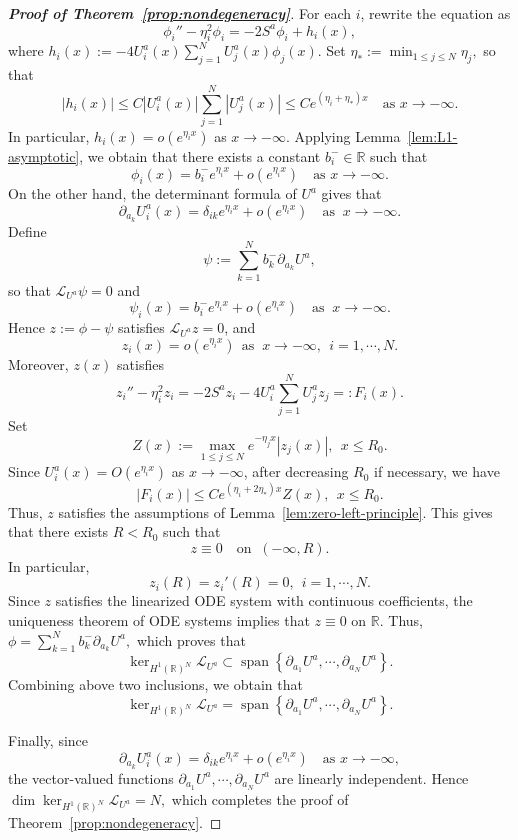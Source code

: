 \documentclass[11pt]{article}
\numberwithin{equation}{section}
\newcommand{\R}{{\mathbb{R}}}
\theoremstyle{definition}
\begin{document}
\begin{proof}[\normalfont\bfseries Proof of Theorem~\ref{prop:nondegeneracy}]
For each \(i\), rewrite the equation as
\[
\phi_i''-\eta_i^2\phi_i
=
-2S^a\phi_i+h_i(x),
\]
where
\(
h_i(x):=-4U_i^a(x)\sum_{j=1}^N U_j^a(x)\phi_j(x).
\)
Set
$
\eta_*:=\min_{1\le j\le N}\eta_j,
$
so that
\[
|h_i(x)|
\le
C |U_i^a(x)|\sum_{j=1}^N |U_j^a(x)|
\le
C e^{(\eta_i+\eta_*)x}\quad \text{as }x\to-\infty.
\]
In particular,
$
h_i(x)=o(e^{\eta_i x})
$ as $x\to-\infty$.
Applying Lemma~\ref{lem:L1-asymptotic}, we obtain that there exists a constant
\(b_i^-\in\mathbb R\) such that
\[
\phi_i(x)=b_i^-e^{\eta_i x}+o(e^{\eta_i x})\quad \text{as }x\to-\infty.
\]
On the other hand, the determinant formula of \(U^a\) gives that
\[
\partial_{a_k}U_i^a(x)
=
\delta_{ik}e^{\eta_i x}+o(e^{\eta_i x})\quad \text{as }\ x\to-\infty.
\]
Define
\[
\psi
:=
\sum_{k=1}^N b_k^-\partial_{a_k}U^a,
\]
so that $\mathcal L_{U^a}\psi=0$
and
\[
\psi_i(x)=b_i^-e^{\eta_i x}+o(e^{\eta_i x})\quad \text{as }\ x\to-\infty.
\]
Hence
\(
z:=\phi-\psi
\)
satisfies
$\mathcal L_{U^a}z=0$,
and
\[
z_i(x)=o(e^{\eta_i x})
\ \ \text{as }\ x\to-\infty, \ \ i=1,\cdots,N.
\]
Moreover, $z(x)$ satisfies
\[
z_i''-\eta_i^2 z_i
=
-2S^a z_i
-4U_i^a\sum_{j=1}^N U_j^a z_j
=:F_i(x).
\]
Set
\[
Z(x):=\max_{1\le j\le N}e^{-\eta_jx}|z_j(x)|, \ \  x\le R_0.
\]
Since \(U_i^a(x)=O(e^{\eta_i x})\) as \(x\to-\infty\), after decreasing
\(R_0\) if necessary, we have
\[
|F_i(x)|
\le
C e^{(\eta_i+2\eta_*)x}Z(x),
\ \  x\le R_0.
\]
Thus, \(z\) satisfies the assumptions of
Lemma~\ref{lem:zero-left-principle}. This gives that there exists \(R<R_0\) such that
\[
z\equiv0 \quad\text{on }\ (-\infty,R).
\]
In particular,
\[
z_i(R)=z_i'(R)=0,\ \  i=1,\cdots,N.
\]
Since \(z\) satisfies the linearized ODE system with continuous
coefficients, the uniqueness theorem of ODE systems
implies that
$z\equiv0$ on $\R$.
Thus,
\(
\phi
=
\sum_{k=1}^N b_k^-\partial_{a_k}U^a,
\)
which proves that
\[
\ker_{H^1(\mathbb R)^N}\mathcal L_{U^a}
\subset
\operatorname{span}
\left\{
\partial_{a_1}U^a,\cdots,\partial_{a_N}U^a
\right\}.
\]
Combining above two inclusions, we obtain that
\[
\ker_{H^1(\mathbb R)^N}\mathcal L_{U^a}
=
\operatorname{span}
\left\{
\partial_{a_1}U^a,\cdots,\partial_{a_N}U^a
\right\}.
\]



Finally, since
\[
\partial_{a_k}U_i^a(x)
=
\delta_{ik}e^{\eta_i x}+o(e^{\eta_i x})\quad \text{as }x\to-\infty,
\]
the vector-valued functions
$
\partial_{a_1}U^a,\cdots,\partial_{a_N}U^a
$
are linearly independent. Hence
$
\dim\ker_{H^1(\mathbb R)^N}\mathcal L_{U^a}=N,
$
which completes the proof of Theorem~\ref{prop:nondegeneracy}.
\end{proof}
\end{document}

